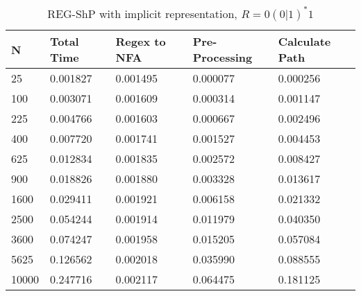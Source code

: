 \documentclass[]{article}
\numberwithin{equation}{section}
\begin{document}
\begin{appendices}
\begin{table}[H]
	\centering
	\small
	\setlength\tabcolsep{2pt}
	\begin{tabular}{|l|l|l|l|l|}
		\hline
		N     & Total Time & Regex to NFA & Pre-Processing  & Calculate Path    \\ \hline
		25    & 0.001827   & 0.001495     & 0.000077        & 0.000256  		\\ \hline
		100   & 0.003071   & 0.001609     & 0.000314        & 0.001147  		\\ \hline
		225   & 0.004766   & 0.001603     & 0.000667        & 0.002496  		\\ \hline
		400   & 0.007720   & 0.001741     & 0.001527        & 0.004453  		\\ \hline
		625   & 0.012834   & 0.001835     & 0.002572        & 0.008427  		\\ \hline
		900   & 0.018826   & 0.001880     & 0.003328        & 0.013617  		\\ \hline
		1600  & 0.029411   & 0.001921     & 0.006158        & 0.021332  		\\ \hline
		2500  & 0.054244   & 0.001914     & 0.011979        & 0.040350  		\\ \hline
		3600  & 0.074247   & 0.001958     & 0.015205        & 0.057084  		\\ \hline
		5625  & 0.126562   & 0.002018     & 0.035990        & 0.088555  		\\ \hline
		10000 & 0.247716   & 0.002117     & 0.064475        & 0.181125  		\\ \hline
	\end{tabular}
	\caption{REG-ShP with implicit representation, $R = 0(0|1)^*1$}
\end{table}


\end{appendices}
\end{document}
